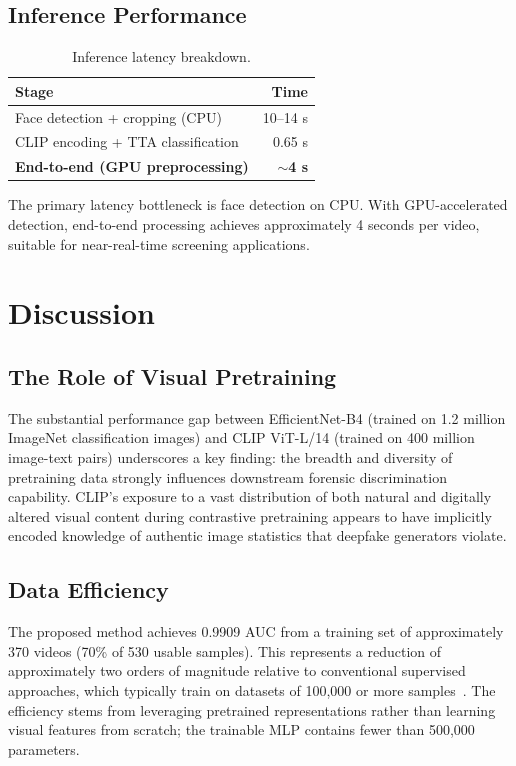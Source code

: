 \documentclass[11pt, twocolumn]{article}
\begin{document}
\subsection{Inference Performance}

\begin{table}[H]
\centering
\caption{Inference latency breakdown.}
\small
\begin{tabular}{lr}
\toprule
Stage & Time \\
\midrule
Face detection + cropping (CPU) & 10--14 s \\
CLIP encoding + TTA classification & 0.65 s \\
\midrule
\textbf{End-to-end (GPU preprocessing)} & \textbf{$\sim$4 s} \\
\bottomrule
\end{tabular}
\end{table}

The primary latency bottleneck is face detection on CPU. With GPU-accelerated detection, end-to-end processing achieves approximately 4 seconds per video, suitable for near-real-time screening applications.

\section{Discussion}

\subsection{The Role of Visual Pretraining}

The substantial performance gap between EfficientNet-B4 (trained on 1.2 million ImageNet classification images) and CLIP ViT-L/14 (trained on 400 million image-text pairs) underscores a key finding: the breadth and diversity of pretraining data strongly influences downstream forensic discrimination capability. CLIP's exposure to a vast distribution of both natural and digitally altered visual content during contrastive pretraining appears to have implicitly encoded knowledge of authentic image statistics that deepfake generators violate.

\subsection{Data Efficiency}

The proposed method achieves 0.9909 AUC from a training set of approximately 370 videos (70\% of 530 usable samples). This represents a reduction of approximately two orders of magnitude relative to conventional supervised approaches, which typically train on datasets of 100,000 or more samples~\cite{rossler2019faceforensics, dolhansky2020dfdc}. The efficiency stems from leveraging pretrained representations rather than learning visual features from scratch; the trainable MLP contains fewer than 500,000 parameters.
\end{document}
